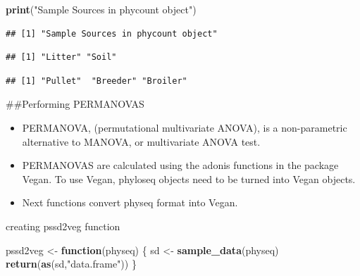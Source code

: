 \documentclass[
]{article}
\newenvironment{Shaded}{\begin{snugshade}}{\end{snugshade}}
\newcommand{\ControlFlowTok}[1]{\textcolor[rgb]{0.13,0.29,0.53}{\textbf{#1}}}
\newcommand{\FunctionTok}[1]{\textcolor[rgb]{0.13,0.29,0.53}{\textbf{#1}}}
\newcommand{\NormalTok}[1]{#1}
\newcommand{\OtherTok}[1]{\textcolor[rgb]{0.56,0.35,0.01}{#1}}
\newcommand{\SpecialCharTok}[1]{\textcolor[rgb]{0.81,0.36,0.00}{\textbf{#1}}}
\newcommand{\StringTok}[1]{\textcolor[rgb]{0.31,0.60,0.02}{#1}}
\providecommand{\tightlist}{%
  \setlength{\itemsep}{0pt}\setlength{\parskip}{0pt}}
\begin{document}
\begin{Shaded}
\begin{Highlighting}[]
\FunctionTok{print}\NormalTok{(}\StringTok{"Sample Sources in phycount object"}\NormalTok{)}
\end{Highlighting}
\end{Shaded}

\begin{verbatim}
## [1] "Sample Sources in phycount object"
\end{verbatim}

\begin{Shaded}
\end{Shaded}

\begin{verbatim}
## [1] "Litter" "Soil"
\end{verbatim}

\begin{Shaded}
\end{Shaded}

\begin{verbatim}
## [1] "Pullet"  "Breeder" "Broiler"
\end{verbatim}

\#\#Performing PERMANOVAS

\begin{itemize}
\tightlist
\item
  PERMANOVA, (permutational multivariate ANOVA), is a non-parametric
  alternative to MANOVA, or multivariate ANOVA test.
\item
  PERMANOVAS are calculated using the adonis functions in the package
  Vegan. To use Vegan, phyloseq objects need to be turned into Vegan
  objects.
\item
  Next functions convert physeq format into Vegan.
\end{itemize}

creating pssd2veg function

\begin{Shaded}
\begin{Highlighting}[]
\NormalTok{pssd2veg }\OtherTok{\textless{}{-}} \ControlFlowTok{function}\NormalTok{(physeq) \{}
\NormalTok{  sd }\OtherTok{\textless{}{-}} \FunctionTok{sample\_data}\NormalTok{(physeq)}
  \FunctionTok{return}\NormalTok{(}\FunctionTok{as}\NormalTok{(sd,}\StringTok{"data.frame"}\NormalTok{))}
\NormalTok{\}}
\end{Highlighting}
\end{Shaded}
\end{document}
